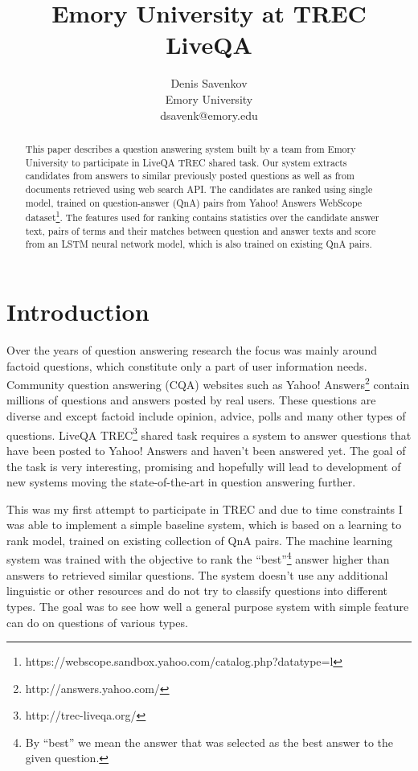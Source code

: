 \documentclass[]{article}
\title{Emory University at TREC LiveQA}
\author{Denis Savenkov\\Emory University\\dsavenk@emory.edu}
\date{}
\begin{document}
\maketitle

\begin{abstract}
This paper describes a question answering system built by a team from Emory University to participate in LiveQA TREC shared task.
Our system extracts candidates from answers to similar previously posted questions as well as from documents retrieved using web search API.
The candidates are ranked using single model, trained on question-answer (QnA) pairs from Yahoo! Answers WebScope dataset\footnote{https://webscope.sandbox.yahoo.com/catalog.php?datatype=l}.
The features used for ranking contains statistics over the candidate answer text, pairs of terms and their matches between question and answer texts and score from an LSTM neural network model, which is also trained on existing QnA pairs.

\end{abstract}

\section{Introduction}
Over the years of question answering research the focus was mainly around factoid questions, which constitute only a part of user information needs.
Community question answering (CQA) websites such as Yahoo! Answers\footnote{http://answers.yahoo.com/} contain millions of questions and answers posted by real users.
These questions are diverse and except factoid include opinion, advice, polls and many other types of questions. 
LiveQA TREC\footnote{http://trec-liveqa.org/} shared task requires a system to answer questions that have been posted to Yahoo! Answers and haven't been answered yet. 
The goal of the task is very interesting, promising and hopefully will lead to development of new systems moving the state-of-the-art in question answering further.

This was my first attempt to participate in TREC and due to time constraints I was able to implement a simple baseline system, which is based on a learning to rank model, trained on existing collection of QnA pairs.
The machine learning system was trained with the objective to rank the ``best''\footnote{By ``best'' we mean the answer that was selected as the best answer to the given question.} answer higher than answers to retrieved similar questions.
The system doesn't use any additional linguistic or other resources and do not try to classify questions into different types.
The goal was to see how well a general purpose system with simple feature can do on questions of various types.
\end{document}
